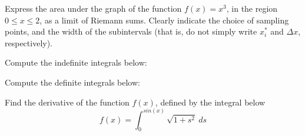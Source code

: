 \documentclass[11pt]{exam}
\begin{document}
%
%
%

\begin{questions}



\addpoints
\question[2] Express the area under the graph of the function $f(x)=x^3$, in the region $0 \leq x \leq 2$, as a limit of Riemann sums. Clearly indicate the choice of sampling points, and the width of the subintervals (that is, do not simply write $x_{i}^{*}$ and $\Delta x$, respectively). 

\newpage

\addpoints
\question Compute the indefinite integrals below:
\newpage

\addpoints
\question Compute the definite integrals below: 
\newpage
\addpoints

\question[4] Find the derivative of the function $f(x)$, defined by the integral below
\begin{equation*}
f(x)=\int_{0}^{sin(x)} \sqrt{1+s^2} \ ds
\end{equation*}

\addpoints
\end{questions}
\end{document}

